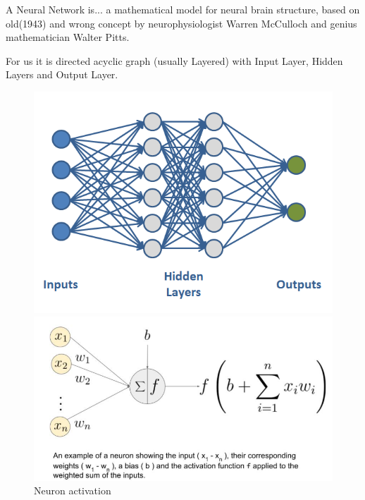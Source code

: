 \documentclass{beamer}
\theoremstyle{remark}
\begin{document}
\begin{frame}{A Neural Network is...}
    a mathematical model for neural brain structure, based on old(1943) and wrong concept by neurophysiologist Warren McCulloch and genius mathematician Walter Pitts.\vspace{0.1in}
    
    For us it is directed acyclic graph (usually Layered) with Input Layer, Hidden Layers and Output Layer. 
    \begin{figure}
        \centering
        \begin{minipage}{0.5\textwidth}
            \centering
            \includegraphics[width=\textwidth]{pictures/NN.png} %
            \caption{Dense Layered Neural Network}
        \end{minipage}\hfill
        \begin{minipage}{0.5\textwidth}
            \centering
            \includegraphics[width=\textwidth]{pictures/neuron.png} %
            \caption{Neuron activation}
        \end{minipage}
    \end{figure}
\end{frame}
\end{document}
